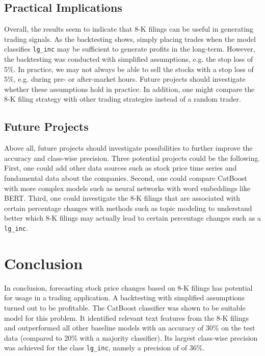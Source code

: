 \documentclass{article}
\begin{document}
	\subsection{Practical Implications}
	
	Overall, the results seem to indicate that 8-K filings can be useful in generating trading signals. As the backtesting shows, simply placing trades when the model classifies \lstinline{lg_inc} may be sufficient to generate profits in the long-term. However, the backtesting was conducted with simplified assumptions, e.g. the stop loss of 5\%. In practice, we may not always be able to sell the stocks with a stop loss of 5\%, e.g. during pre- or after-market hours. Future projects should investigate whether these assumptions hold in practice. In addition, one might compare the 8-K filing strategy with other trading strategies instead of a random trader. 
	
	\subsection{Future Projects}
		
	Above all, future projects should investigate possibilities to further improve the accuracy and class-wise precision. Three potential projects could be the following. First, one could add other data sources such as stock price time series and fundamental data about the companies. Second, one could compare CatBoost with more complex models such as neural networks with word embeddings like BERT. Third, one could investigate the 8-K filings that are associated with certain percentage changes with methods such as topic modeling to understand better which 8-K filings may actually lead to certain percentage changes such as a \lstinline{lg_inc}.
	

	\section{Conclusion}

	In conclusion, forecasting stock price changes based on 8-K filings has potential for usage in a  trading application. A backtesting with simplified assumptions turned out to be profitable. The CatBoost classifier was shown to be suitable model for this problem. It identified relevant text features from the 8-K filings and outperformed all other baseline models with an accuracy of 30\% on the test data (compared to 20\% with a majority classifier). Its largest class-wise precision was achieved for the class \lstinline{lg_inc}, namely a precision of of 36\%. 
	
\clearpage
\printbibliography
\end{document}

